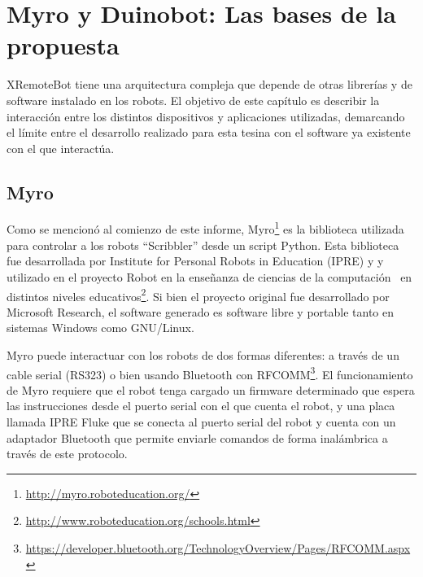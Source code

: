 \chapter{Myro y Duinobot: Las bases de la propuesta}\label{cha:myro_y_duinobot}




XRemoteBot tiene una arquitectura compleja que
depende de otras librerías y de software instalado en los robots.
El objetivo de este capítulo es describir la interacción entre los
distintos dispositivos y aplicaciones utilizadas, demarcando el límite
entre el desarrollo realizado para esta tesina con el software ya
existente con el que interactúa.

\section{Myro}\label{sec:myro}

Como se mencionó al comienzo de este informe,
Myro\footnote{\url{http://myro.roboteducation.org/}}
es la biblioteca utilizada para controlar a los robots
``Scribbler''
desde un script Python. Esta biblioteca fue desarrollada por
Institute for Personal Robots in Education (IPRE) y
y utilizado en el proyecto Robot en la enseñanza de ciencias
de la computación~\citep{kumar_2009}
en distintos niveles
educativos\footnote{\url{http://www.roboteducation.org/schools.html}}.
Si bien el proyecto original fue desarrollado por Microsoft Research,
el software generado es software libre y portable tanto en sistemas Windows
como GNU/Linux.

Myro puede interactuar con los robots de dos
formas diferentes: a través de un cable serial (RS323) o bien usando Bluetooth
con RFCOMM\footnote{\url{https://developer.bluetooth.org/TechnologyOverview/Pages/RFCOMM.aspx}}.
El funcionamiento de Myro requiere que el robot tenga
cargado un firmware determinado que espera las instrucciones desde el puerto
serial con el que cuenta el robot, y una placa llamada IPRE Fluke que se conecta
al puerto serial del robot y cuenta con un adaptador Bluetooth que permite
enviarle comandos de forma inalámbrica a través de este protocolo.

